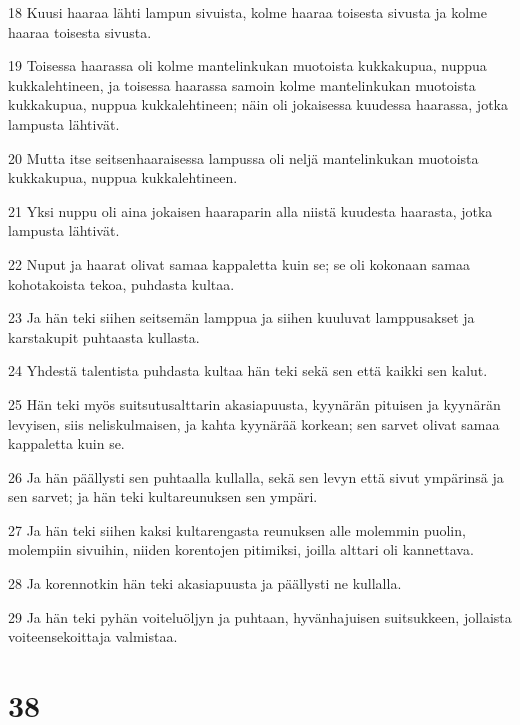\par 18 Kuusi haaraa lähti lampun sivuista, kolme haaraa toisesta sivusta ja kolme haaraa toisesta sivusta.
\par 19 Toisessa haarassa oli kolme mantelinkukan muotoista kukkakupua, nuppua kukkalehtineen, ja toisessa haarassa samoin kolme mantelinkukan muotoista kukkakupua, nuppua kukkalehtineen; näin oli jokaisessa kuudessa haarassa, jotka lampusta lähtivät.
\par 20 Mutta itse seitsenhaaraisessa lampussa oli neljä mantelinkukan muotoista kukkakupua, nuppua kukkalehtineen.
\par 21 Yksi nuppu oli aina jokaisen haaraparin alla niistä kuudesta haarasta, jotka lampusta lähtivät.
\par 22 Nuput ja haarat olivat samaa kappaletta kuin se; se oli kokonaan samaa kohotakoista tekoa, puhdasta kultaa.
\par 23 Ja hän teki siihen seitsemän lamppua ja siihen kuuluvat lamppusakset ja karstakupit puhtaasta kullasta.
\par 24 Yhdestä talentista puhdasta kultaa hän teki sekä sen että kaikki sen kalut.
\par 25 Hän teki myös suitsutusalttarin akasiapuusta, kyynärän pituisen ja kyynärän levyisen, siis neliskulmaisen, ja kahta kyynärää korkean; sen sarvet olivat samaa kappaletta kuin se.
\par 26 Ja hän päällysti sen puhtaalla kullalla, sekä sen levyn että sivut ympärinsä ja sen sarvet; ja hän teki kultareunuksen sen ympäri.
\par 27 Ja hän teki siihen kaksi kultarengasta reunuksen alle molemmin puolin, molempiin sivuihin, niiden korentojen pitimiksi, joilla alttari oli kannettava.
\par 28 Ja korennotkin hän teki akasiapuusta ja päällysti ne kullalla.
\par 29 Ja hän teki pyhän voiteluöljyn ja puhtaan, hyvänhajuisen suitsukkeen, jollaista voiteensekoittaja valmistaa.

\chapter{38}

